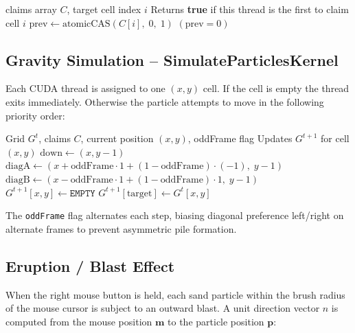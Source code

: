 \documentclass[12pt,a4paper]{article}
\begin{document}
\begin{algorithm}
\caption{AtomicCheckUnclaimed -- GPU Device Function}
\begin{algorithmic}[1]
    \Require claims array $C$, target cell index $i$
    \Ensure Returns \textbf{true} if this thread is the first to claim cell $i$
    \State $\text{prev} \leftarrow \text{atomicCAS}(C[i], \; 0, \; 1)$
    \State \Return $(\text{prev} = 0)$
\end{algorithmic}
\end{algorithm}

	\subsection{Gravity Simulation -- SimulateParticlesKernel}
    Each CUDA thread is assigned to one $(x, y)$ cell. If the cell is empty the thread exits 
    immediately. Otherwise the particle attempts to move in the following priority order:

\begin{algorithm}
\caption{Particle Gravity Transition}
\begin{algorithmic}[1]
    \Require Grid $G^t$, claims $C$, current position $(x,y)$, oddFrame flag
    \Ensure Updates $G^{t+1}$ for cell $(x,y)$
     \Return \EndIf
    \State $\text{down} \leftarrow (x, y-1)$
    \State $\text{diagA} \leftarrow (x + \text{oddFrame} \cdot 1 + (1-\text{oddFrame}) \cdot (-1),\; y-1)$
    \State $\text{diagB} \leftarrow (x - \text{oddFrame} \cdot 1 + (1-\text{oddFrame}) \cdot 1, \;y-1)$
            \State $G^{t+1}[x,y] \leftarrow \texttt{EMPTY}$
            \State $G^{t+1}[\text{target}] \leftarrow G^t[x,y]$
            \State \Return
        \EndIf
    \EndFor
\end{algorithmic}
\end{algorithm}

    The \texttt{oddFrame} flag alternates each step, biasing diagonal preference left/right 
    on alternate frames to prevent asymmetric pile formation.

	\subsection{Eruption / Blast Effect}
    When the right mouse button is held, each sand particle within the brush radius of the 
    mouse cursor is subject to an outward blast. A unit direction vector $\hat{n}$ is computed 
    from the mouse position $\mathbf{m}$ to the particle position $\mathbf{p}$:
\end{document}
